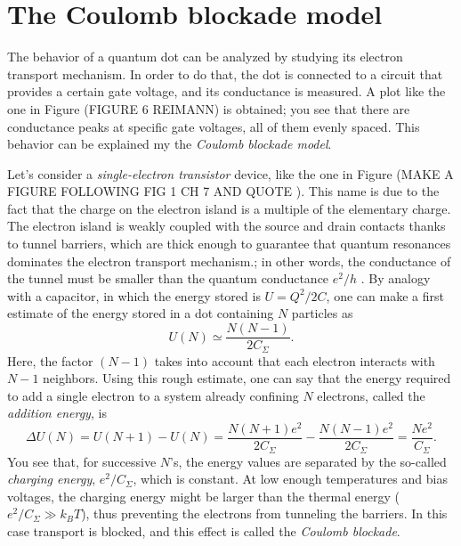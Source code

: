 \documentclass[a4paper,twoside,11pt]{book}
\begin{document}
\section{The Coulomb blockade model}
The behavior of a quantum dot can be analyzed by studying its electron transport mechanism. In order to do that, the dot is connected to a circuit that provides a certain gate voltage, and its conductance is measured. A plot like the one in Figure (FIGURE 6 REIMANN) is obtained; you see that there are conductance peaks at specific gate voltages, all of them evenly spaced. This behavior can be explained my the \emph{Coulomb blockade model}.

Let's consider a \emph{single-electron transistor} device, like the one in Figure (MAKE A FIGURE FOLLOWING FIG 1 CH 7 AND QUOTE \cite{Fasth2007}). This name is due to the fact that the charge on the electron island is a multiple of the elementary charge. The electron island is weakly coupled with the source and drain contacts thanks to tunnel barriers, which are thick enough to guarantee that quantum resonances dominates the electron transport mechanism.; in other words, the conductance of the tunnel must be smaller than the quantum conductance $e^2/h$ \citep[see][]{Reimann2002}. By analogy with a capacitor, in which the energy stored is $U=Q^2/2C$, one can make a first estimate of the energy stored in a dot containing $N$ particles as
\begin{equation}
	U(N) \simeq \frac{N(N-1)}{2C_{\Sigma}}.
\end{equation}
Here, the factor $(N-1)$ takes into account that each electron interacts with $N-1$ neighbors. Using this rough estimate, one can say that the energy required to add a single electron to a system already confining $N$ electrons, called the \emph{addition energy}, is
\begin{equation}
	\Delta U (N) = U(N+1)-U(N) = \frac{N(N+1)e^2}{2C_{\Sigma}} - \frac{N(N-1)e^2}{2C_{\Sigma}} = \frac{Ne^2}{C_{\Sigma}}.
\end{equation}
You see that, for successive $N$'s, the energy values are separated by the so-called \emph{charging energy}, $e^2/C_{\Sigma}$, which is constant. At low enough temperatures and bias voltages, the charging energy might be larger than the thermal energy ($e^2/C_{\Sigma} \gg k_BT$), thus preventing the electrons from tunneling the barriers. In this case transport is blocked, and this effect is called the \emph{Coulomb blockade}.
\end{document}
